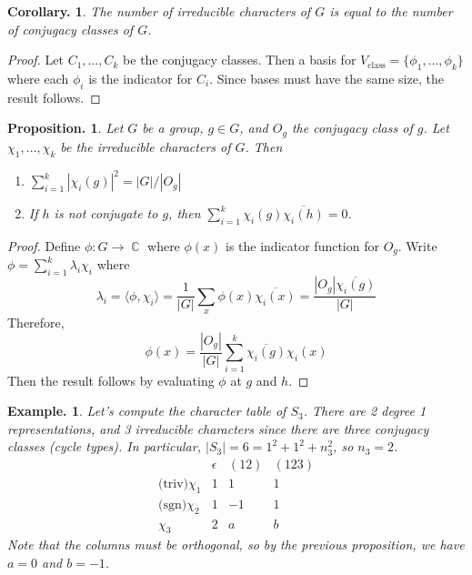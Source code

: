 \documentclass[11pt, a4paper]{memoir}
\DeclareMathOperator{\C}{{\mathbb{C}}}
\theoremstyle{change}
\newtheorem{corollary}[theorem]{Corollary.}
\newtheorem{proposition}[theorem]{Proposition.}
\theoremstyle{plain}
\theoremstyle{nonumberplain}
\newtheorem{example}{Example.}
\newtheorem{proof}{Proof}
\numberwithin{equation}{section}
\begin{document}
\begin{corollary}
    The number of irreducible characters of $G$ is equal to the number of conjugacy classes of $G$.
\end{corollary}
\begin{proof}
    Let $C_1,\ldots,C_k$ be the conjugacy classes.
    Then a basis for $V_{\text{class}}=\{\phi_1,\ldots,\phi_k\}$ where each $\phi_i$ is the indicator for $C_i$.
    Since bases must have the same size, the result follows.
\end{proof}
\begin{proposition}
    Let $G$ be a group, $g\in G$, and $O_g$ the conjugacy class of $g$.
    Let $\chi_1,\ldots,\chi_k$ be the irreducible characters of $G$.
    Then
    \begin{enumerate}[nl]
        \item $\sum_{i=1}^k|\chi_i(g)|^2=|G|/|O_g|$
        \item If $h$ is not conjugate to $g$, then $\sum_{i=1}^k\chi_i(g)\overline{\chi_i(h)}=0$.
    \end{enumerate}
\end{proposition}
\begin{proof}
    Define $\phi:G\to\C$ where $\phi(x)$ is the indicator function for $O_g$.
    Write $\phi=\sum_{i=1}^k \lambda_i\chi_i$ where
    \begin{equation*}
        \lambda_i=\langle\phi,\chi_i\rangle=\frac{1}{|G|}\sum_x\phi(x)\overline{\chi_i(x)}=\frac{|O_g|\overline{\chi_i(g)}}{|G|}
    \end{equation*}
    Therefore,
    \begin{equation*}
        \phi(x) = \frac{|O_g|}{|G|}\sum_{i=1}^k\overline{\chi_i(g)}\chi_i(x)
    \end{equation*}
    Then the result follows by evaluating $\phi$ at $g$ and $h$.
\end{proof}
\begin{example}
    Let's compute the character table of $S_3$.
    There are 2 degree 1 representations, and 3 irreducible characters since there are three conjugacy classes (cycle types).
    In particular, $|S_3|=6=1^2+1^2+n_3^2$, so $n_3=2$.
    \begin{equation*}
        \begin{array}{c|ccc}
            &\epsilon & (12) & (123)\\
            \text{(triv)}\chi_1 & 1&1&1\\
            \text{(sgn)}\chi_2 & 1&-1&1\\
            \chi_3 & 2 &a & b
        \end{array}
    \end{equation*}
    Note that the columns must be orthogonal, so by the previous proposition, we have $a=0$ and $b=-1$.
\end{example}
\end{document}
